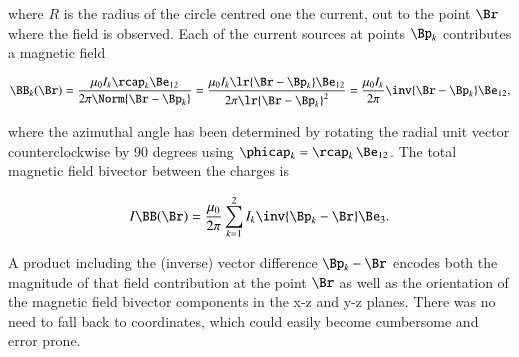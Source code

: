 where \( R \) is the radius of the circle centred one the current, out to the point \( \Br \) where the field is observed.  
Each of the current sources at points \( \Bp_k \) contributes a magnetic field

\begin{dmath}\label{eqn:maxwells:80}
\BB_k(\Br)
= \frac{\mu_0 I_k \rcap_k \Be_{12} }{2 \pi \Norm{ \Br - \Bp_k} }
= \frac{\mu_0 I_k \lr{ \Br - \Bp_k} \Be_{12} }{2 \pi \lr{ \Br - \Bp_k}^2 }
= \frac{\mu_0 I_k}{2\pi} \inv{ \Br - \Bp_k} \Be_{12},
\end{dmath}

where the azimuthal angle has been determined by rotating the radial unit vector counterclockwise by 90 degrees using \( \phicap_k = \rcap_k\, \Be_{12} \).  The total magnetic field bivector between the charges is

\begin{equation}\label{eqn:maxwells:100}
I \BB(\Br)
= \frac{\mu_0}{2\pi} \sum_{k = 1}^2 I_k \inv{\Bp_k - \Br } \Be_3.
\end{equation}

A product including the (inverse) vector difference \( \Bp_k - \Br \) encodes both the magnitude of that field contribution at the point \( \Br \) as well as the orientation of the magnetic field bivector components in the x-z and y-z planes.  
There was no need to fall back to coordinates, which could easily become cumbersome and error prone.
